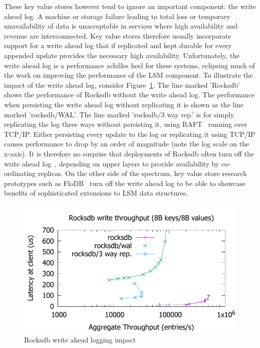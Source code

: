 \documentclass[twocolumn]{article}
\begin{document}
These key value stores however tend to ignore an important component: the write
ahead log. A machine or storage failure leading to total loss or temporary
unavailability of data is unacceptable in services where high availability and
revenue are interconnected. Key value stores therefore usually incorporate
support for a write ahead log that if replicated and kept durable for every
appended update provides the necessary high availability. Unfortunately, the
write ahead log is a performance achilles heel for these systems, eclipsing much
of the work on improving the performance of the LSM component. To illustrate the
impact of the write ahead log, consider Figure~\ref{fig:problem}. The line
marked 'Rocksdb' shows the performance of Rocksdb without the write ahead
log. The performance when persisting the write ahead log without replicating it
is shown as the line marked 'rocksdb/WAL'. The line marked 'rocksdb/3 way rep.'
is for simply replicating the log three ways without persisting it, using
RAFT~\cite{raft} running over TCP/IP. Either persisting every update to the log
or replicating it using TCP/IP causes performance to drop by an order of
magnitude (note the log scale on the x-axis). It is therefore no surprise that
deployments of Rocksdb often turn off the write ahead log~\cite{samza},
depending on upper layers to provide availability by co-ordinating replicas. On
the other side of the spectrum, key value store research prototypes such as
FloDB~\cite{flodb} turn off the write ahead log to be able to showcase benefits
of sophisticated extensions to LSM data structures.


\begin{figure}
\centering \includegraphics[scale=0.6]{results2/problem.pdf}
\caption{Rocksdb write ahead logging impact}
\label{fig:problem}
\end{figure}
\end{document}

